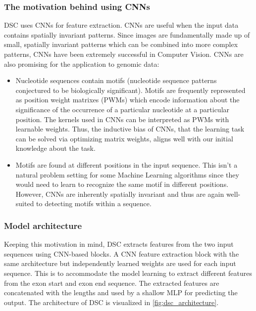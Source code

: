 \subsubsection{The motivation behind using CNNs}
DSC uses CNNs for feature extraction. 
CNNs are useful when the input data contains spatially invariant patterns.  Since images are fundamentally made up of small, spatially invariant patterns which can be combined into more complex patterns, CNNs have been extremely successful in Computer Vision.
CNNs are also promising for the application to genomic data: 
\begin{itemize}
	\item Nucleotide sequences contain motifs (nucleotide sequence patterns conjectured to be biologically significant). Motifs are frequently represented as position weight matrixes (PWMs) which encode information about the significance of the occurrence of a particular nucleotide at a particular position. The kernels used in CNNs can be interpreted as PWMs with learnable weights. Thus, the inductive bias of CNNs, that the learning task can be solved via optimizing matrix weights, aligns well with our initial knowledge about the task. %
	\item Motifs are found at different positions in the input sequence. This isn't a natural problem setting for some Machine Learning algorithms since they would need to learn to recognize the same motif in different positions. However, CNNs are inherently spatially invariant and thus are again well-suited to detecting motifs within a sequence.
\end{itemize}


\subsubsection{Model architecture}
Keeping this motivation in mind, DSC extracts features from the two input sequences using CNN-based blocks. A CNN feature extraction block with the same architecture but independently learned weights are used for each input sequence. This is to accommodate the model learning to extract different features from the exon start and exon end sequence. The extracted features are concatenated with the lengths and used by a shallow MLP for predicting the output. The architecture of DSC is visualized in \ref{fig:dsc_architecture}.

